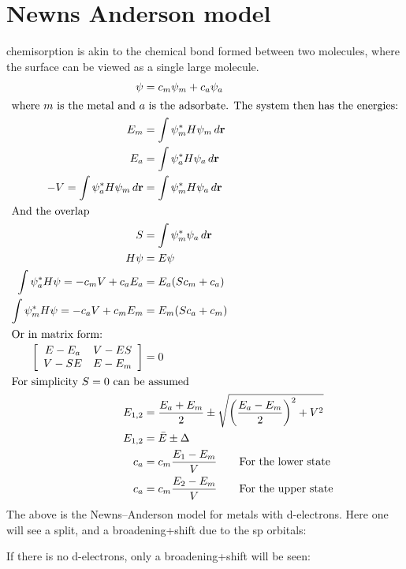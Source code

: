 \documentclass[article,oneside]{memoir}
\begin{document}
\section{Newns Anderson model}
chemisorption is akin to the chemical bond formed between two molecules, where the surface can be viewed as a single large molecule.
\begin{align*}
        \psi&=c_m\psi_m+c_a\psi_a\\
        \intertext{where $m$ is the metal and $a$ is the adsorbate. The system then has the energies:}
        E_m&=\int\psi_{m}^*H\psi_{m}\,d\mathbf{r}\\
        E_a&=\int\psi_{a}^*H\psi_{a}\,d\mathbf{r}\\
        -V=\int\psi_{a}^*H\psi_{m}\,d\mathbf{r}&=\int\psi_{m}^*H\psi_{a}\,d\mathbf{r}\\
        \intertext{And the overlap}
        S&=\int\psi_{m}^*\psi_{a}\,d\mathbf{r}\\
        H\psi&=E\psi\\
        \int \psi_{a}^*H\psi=-c_mV+c_aE_a&=E_a(Sc_m+c_a)\\
        \int \psi_{m}^*H\psi=-c_aV+c_mE_m&=E_m(Sc_a+c_m)\\
        \intertext{Or in matrix form:}
        \left[\begin{array}{cc}
                E-E_a & V-ES\\
                V-SE & E-E_m
        \end{array}\right] &= 0\\
        \intertext{For simplicity $S=0$ can be assumed}
        E_{1,2}&= \frac{E_a+E_m}{2}\pm \sqrt{\left(\frac{E_a-E_m}{2}\right)^2+V^2}\\
        E_{1,2}&= \bar{E} \pm\Delta\\
        c_a&=c_m \frac{E_1-E_m}{V}\qquad\textup{For the lower state}\\
        c_a&=c_m \frac{E_2-E_m}{V}\qquad\textup{For the upper state}\\
\end{align*}
The above is the Newns--Anderson model for metals with d-electrons. Here one will see a split, and a broadening+shift due to the sp orbitals:


If there is no d-electrons, only a broadening+shift will be seen:

\end{document}
